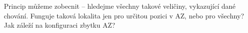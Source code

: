 Princip můžeme zobecnit -- hledejme všechny takové veličiny, vykazující dané chování. Funguje taková lokalita jen pro určitou pozici v AZ, nebo pro všechny? Jak 
záleží na konfiguraci zbytku AZ?






% 
% 
% 
% 
% 
% 
% 
% 
% 
% 
% 
